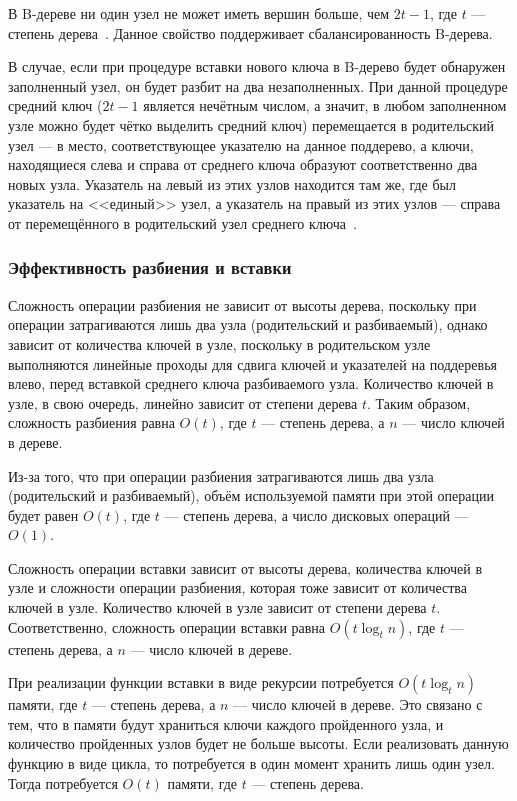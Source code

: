 \documentclass[a4paper,12pt]{article}
\begin{document}
	В B-дереве ни один узел не может иметь вершин больше, чем $2t-1$, где $t$ --- степень дерева~\cite{Kormen}. Данное свойство поддерживает сбалансированность B-дерева.
	
	В случае, если при процедуре вставки нового ключа в B-дерево будет обнаружен заполненный узел, он будет разбит на два незаполненных. При данной процедуре средний ключ ($2t-1$ является нечётным числом, а значит, в любом заполненном узле можно будет чётко выделить средний ключ) перемещается в родительский узел --- в место, соответствующее указателю на данное поддерево, а ключи, находящиеся слева и справа от среднего ключа образуют соответственно два новых узла. Указатель на левый из этих узлов находится там же, где был указатель на <<единый>> узел, а указатель на правый из этих узлов --- справа от перемещённого в родительский узел среднего ключа~\cite{Kormen}.
	
	\subsubsection{Эффективность разбиения и вставки}
	
	Сложность операции разбиения не зависит от высоты дерева, поскольку при операции затрагиваются лишь два узла (родительский и разбиваемый), однако зависит от количества ключей в узле, поскольку в родительском узле выполняются линейные проходы для сдвига ключей и указателей на поддеревья влево, перед вставкой среднего ключа разбиваемого узла. Количество ключей в узле, в свою очередь, линейно зависит от степени дерева $t$. Таким образом, сложность разбиения равна $O(t)$, где $t$ --- степень дерева, а $n$ --- число ключей в дереве.
	
	Из-за того, что при операции разбиения затрагиваются лишь два узла (родительский и разбиваемый), объём используемой памяти при этой операции будет равен $O(t)$, где $t$ --- степень дерева, а число дисковых операций --- $O(1)$.
	
	Сложность операции вставки зависит от высоты дерева, количества ключей в узле и сложности операции разбиения, которая тоже зависит от количества ключей в узле. Количество ключей в узле зависит от степени дерева $t$. Соответственно, сложность операции вставки равна $O(t\log_t n)$, где $t$ --- степень дерева, а $n$ --- число ключей в дереве.
	
	При реализации функции вставки в виде рекурсии потребуется $O(t\log_t n)$ памяти, где $t$ --- степень дерева, а $n$ --- число ключей в дереве. Это связано с тем, что в памяти будут храниться ключи каждого пройденного узла, и количество пройденных узлов будет не больше высоты. Если реализовать данную функцию в виде цикла, то потребуется в один момент хранить лишь один узел. Тогда потребуется $O(t)$ памяти, где $t$ --- степень дерева.
	
\end{document}
